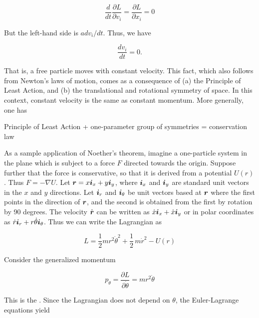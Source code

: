 \begin{equation}
\frac{d}{dt} \frac{\partial L}{\partial v_i} = \frac{\partial L}{\partial x_i} = 0
\end{equation}

But the left-hand side is $a dv_i/dt$.  Thus, we have

\begin{equation}
\frac{dv_i}{dt} = 0.
\end{equation}

That is, a free particle moves with constant velocity. This fact, which also follows from Newton's laws of motion, comes as a consequence of (a) the Principle of Least Action, and (b) the translational and rotational symmetry of space.  In this context, constant velocity is the same as constant momentum.  More generally, one has

\begin{theorem}  
Principle of Least Action + one-parameter group of symmetries = conservation law 
\end{theorem}

As a sample application of Noether's theorem, imagine a one-particle system in the plane which is subject to a force $F$ directed towards the origin. Suppose further that the force is conservative, so that it is derived from a potential $U(r)$.  Thus $F = - \nabla U$.  Let $\boldsymbol{r} = x\boldsymbol{i}_x + y\boldsymbol{i}_y$, where $\boldsymbol{i}_x$ and $\boldsymbol{i}_y$ are standard unit vectors in the $x$ and $y$ directions. Let $\boldsymbol{i}_r$ and $\boldsymbol{i}_\theta$ be unit vectors based at $\boldsymbol{r}$ where the first points in the direction of $\boldsymbol{r}$,  and the second is obtained from the first by rotation by 90 degrees.  The velocity $\dot {\boldsymbol{r}}$ can be written as $\dot x \boldsymbol{i}_x + \dot x \boldsymbol{i}_y$ or in polar coordinates as $\dot r \boldsymbol{i}_r + r\dot \theta \boldsymbol{i}_\theta$.  Thus we can write the Lagrangian as

\begin{equation}
L 
  = \frac{1}{2} mr^2 \dot \theta^2 
  + \frac{1}{2}\, m\dot r^2 
  - U(r)
\end{equation}

Consider the generalized momentum

\begin{equation}
p_\theta = \frac{\partial L}{\partial \dot \theta} = mr^2\dot\theta
\end{equation}

This is the .
Since the Lagrangian does not depend on $\theta$, the Euler-Lagrange equations yield

